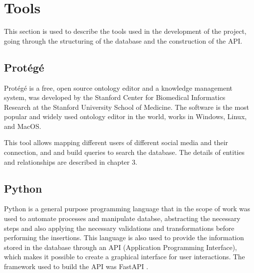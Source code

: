 \chapter{Tools}

This section is used to describe the tools used in the development of the project, going through the structuring of the database and the construction of the API.

\section{Protégé}

Protégé \cite{protege} is a free, open source ontology editor and a knowledge management system, was developed by the Stanford Center for Biomedical Informatics Research at the Stanford University School of Medicine. The software is the most popular and widely used ontology editor in the world, works in Windows, Linux, and MacOS.

This tool allows mapping different users of different social media and their connection, and and build queries to search the database. The details of entities and relationships are described in chapter 3.

\section{Python}
Python \cite{python} is a general purpose programming language that in the scope of work was used to automate processes and manipulate databse, abstracting the necessary steps and also applying the necessary validations and transformations before performing the insertions. 
This language is also used to provide the information stored in the database through an API (Application Programming Interface), which makes it possible to create a graphical interface for user interactions. The framework used to build the API was FastAPI \cite{fastapi}.


